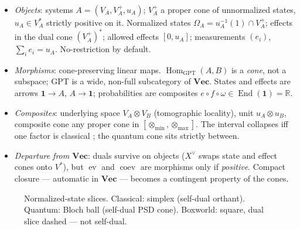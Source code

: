 \documentclass[prl,aps,10pt,superscriptaddress,floatfix]{revtex4-2}
\begin{document}
\begin{itemize}
\item \emph{Objects}: systems $A=(V_A,V_A^+,u_A)$; $V_A^+$ a proper cone of unnormalized states, $u_A\in V_A^*$ strictly positive on it. Normalized states $\Omega_A=u_A^{-1}(1)\cap V_A^+$; effects in the dual cone $(V_A^+)^*$; allowed effects $[0,u_A]$; measurements $(e_i)$, $\sum_ie_i=u_A$. No-restriction by default.
\item \emph{Morphisms}: cone-preserving linear maps. $\operatorname{Hom}_{\mathrm{GPT}}(A,B)$ is a \emph{cone}, not a subspace; GPT is a wide, non-full subcategory of $\mathbf{Vec}$. States and effects are arrows $\mathbf 1\to A$, $A\to\mathbf 1$; probabilities are composites $e\circ f\circ\omega\in\operatorname{End}(\mathbf 1)=\mathbb{R}$.
\item \emph{Composites}: underlying space $V_A\otimes V_B$ (tomographic locality), unit $u_A\otimes u_B$, composite cone any proper cone in $[\otimes_{\min},\otimes_{\max}]$. The interval collapses iff one factor is classical \cite{ALPP2021}; the quantum cone sits strictly between.
\item \emph{Departure from $\mathbf{Vec}$}: duals survive on objects ($X^\vee$ swaps state and effect cones onto $V^*$), but $\operatorname{ev}$ and $\operatorname{coev}$ are morphisms only if \emph{positive}. Compact closure --- automatic in $\mathbf{Vec}$ --- becomes a contingent property of the cones.
\end{itemize}

\begin{figure}[t]
\centering
{}
\caption{Normalized-state slices. Classical: simplex (self-dual orthant). Quantum: Bloch ball (self-dual PSD cone). Boxworld: square, dual slice dashed --- not self-dual.}
\label{fig:examples}
\end{figure}
\end{document}
